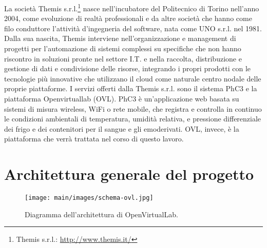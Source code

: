 La società Themis s.r.l.\footnote{Themis s.r.l.: \url{http://www.themis.it/}} nasce nell’incubatore del Politecnico di Torino nell’anno 2004, come evoluzione di realtà professionali e da altre società che hanno come filo conduttore l’attività d’ingegneria del software, nata come UNO s.r.l. nel 1981. Dalla sua nascita, Themis interviene nell’organizzazione e management di progetti per l’automazione di sistemi complessi su specifiche che non hanno riscontro in soluzioni pronte nel settore I.T. e nella  raccolta, distribuzione e gestione di dati e condivisione delle risorse, integrando i propri prodotti con le tecnologie più innovative che utilizzano il cloud come naturale centro nodale delle proprie piattaforme.
\newline
I servizi offerti dalla Themis s.r.l. sono il sistema PhC3 e la piattaforma Openvirtuallab (OVL). PhC3 è un’applicazione web basata su sistemi di misura wireless, WiFi o rete mobile, che registra e controlla in continuo le condizioni ambientali di temperatura, umidità relativa, e pressione differenziale dei frigo e dei contenitori per il sangue e gli emoderivati.
OVL, invece, è la piattaforma che verrà trattata nel corso di questo lavoro.

\newpage
\section{Architettura generale del progetto}
\label{sec:architettura generale del progetto}

\begin{figure}
\begin{center}
\texttt{[image: main/images/schema-ovl.jpg]}
\end{center}
\caption{Diagramma dell'architettura di OpenVirtualLab.}
\label{fig:schema-ovl}
\end{figure}

